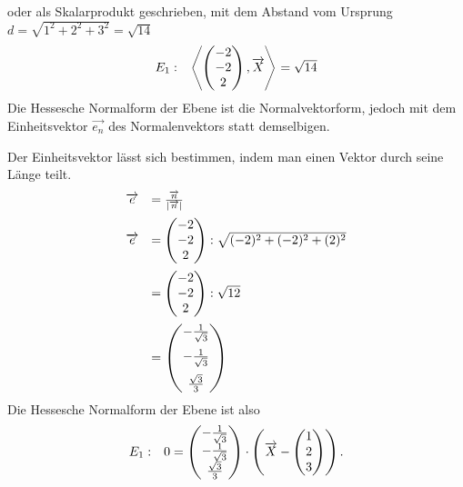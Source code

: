 oder als Skalarprodukt geschrieben, mit dem Abstand vom Ursprung $\displaystyle d=\sqrt{1^{2} +2^{2} +3^{2}} =\sqrt{14}$
\begin{equation*}
	\begin{array}{ r l }
		E_{1} : & \left< \begin{pmatrix}
			-2\\
			-2\\
			2
		\end{pmatrix} ,\vec{X}\right> =\sqrt{14}
	\end{array}
\end{equation*}
Die Hessesche Normalform der Ebene ist die Normalvektorform, jedoch mit dem Einheitsvektor $\displaystyle \overrightarrow{e_{n}}$ des Normalenvektors statt demselbigen.

Der Einheitsvektor lässt sich bestimmen, indem man einen Vektor durch seine Länge teilt.
\begin{equation*}
	\begin{array}{ r l }
		\vec{e} & =\frac{\vec{n}}{| \vec{n}| }\vspace{2mm}\\
		\vec{e} & =\begin{pmatrix}
			-2\\
			-2\\
			2
		\end{pmatrix} :\sqrt{( -2)^{2} +( -2)^{2} +( 2)^{2}}\vspace{2mm}\\
		& =\begin{pmatrix}
			-2\\
			-2\\
			2
		\end{pmatrix} :\sqrt{12}\vspace{2mm}\\
		& =\begin{pmatrix}
			-\frac{1}{\sqrt{3}}\vspace{2mm}\\
			-\frac{1}{\sqrt{3}}\vspace{2mm}\\
			\frac{\sqrt{3}}{3}
		\end{pmatrix}
	\end{array}
\end{equation*}
Die Hessesche Normalform der Ebene ist also
\begin{equation*}
	\begin{array}{ r l }
		E_{1} : & 0=\begin{pmatrix}
			-\frac{1}{\sqrt{3}}\\
			-\frac{1}{\sqrt{3}}\\
			\frac{\sqrt{3}}{3}
		\end{pmatrix} \cdotp \left(\vec{X} -\begin{pmatrix}
			1\\
			2\\
			3
		\end{pmatrix}\right)\text{.}
	\end{array}
\end{equation*}



